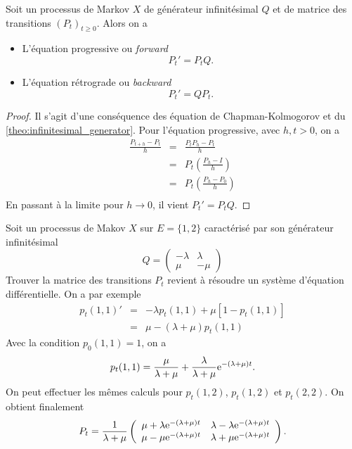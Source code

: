 \begin{prop}
Soit un processus de Markov $X$ de générateur infinitésimal $Q$ et de matrice des transitions $(P_t)_{t\geq0}$. Alors on a 
\begin{itemize}
	\item L'équation progressive ou \textit{forward}
	$$
	P_t' = P_t Q.
	$$
	\item L'équation rétrograde ou \textit{backward}
	$$
	P_t' = Q P_t.
	$$
\end{itemize}
\end{prop}
\begin{proof}
Il s'agit d'une conséquence des équation de Chapman-Kolmogorov et du \cref{theo:infinitesimal_generator}. Pour l'équation progressive, avec $h,t>0$, on a 
\begin{eqnarray*}
\frac{P_{t+h} - P_t}{h}&=&\frac{P_{t}P_{h} - P_t}{h}\\
&=&P_t\left(\frac{P_{h} - I}{h}\right)\\
&=&P_t\left(\frac{P_{h} - P_0}{h}\right)\\
\end{eqnarray*}
En passant à la limite pour $h\rightarrow 0$, il vient $P_t' = P_tQ$.
\end{proof}
\begin{ex}\label{ex:two_state_cont_markov_chain}
Soit un processus de Makov $X$ sur $E=\{1, 2\}$ caractérisé par son générateur infinitésimal 
$$
Q = \left(\begin{array}{cc}
-\lambda & \lambda\\
\mu & -\mu
\end{array}\right)
$$
Trouver la matrice des transitions $P_t$ revient à résoudre un système d'équation différentielle. On a par exemple
\begin{eqnarray*}
p_t(1,1)' &=& -\lambda p_t(1,1)+ \mu[1- p_t(1,1)]\\
&=& \mu - (\lambda + \mu)p_t(1,1)
\end{eqnarray*}
Avec la condition $p_0(1,1) = 1$, on a 
$$
p_t(1,1) = \frac{\mu}{\lambda + \mu} + \frac{\lambda}{\lambda + \mu}\mathrm{e}^{-(\lambda + \mu)t}.
$$
On peut effectuer les mêmes calculs pour $p_t(1,2)$, $p_t(1,2)$ et $p_t(2,2)$. On obtient finalement
$$
P_t = \frac{1}{\lambda + \mu}
\left(\begin{array}{cc}
\mu +\lambda \mathrm{e}^{-(\lambda +\mu)t}&\lambda -\lambda \mathrm{e}^{-(\lambda +\mu)t}\\
\mu -\mu \mathrm{e}^{-(\lambda +\mu)t}&\lambda +\mu \mathrm{e}^{-(\lambda +\mu)t}\\
\end{array}\right).
$$
\end{ex}
